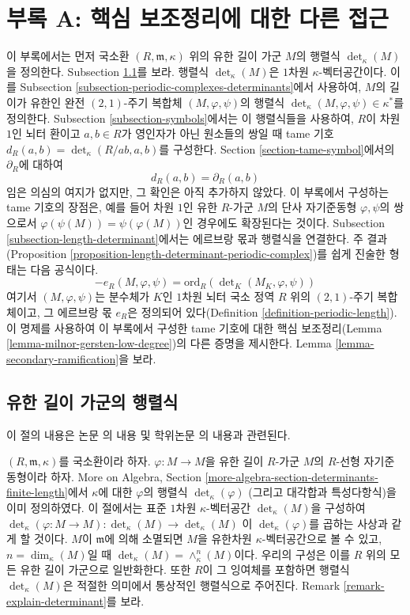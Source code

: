 \section{부록 A: 핵심 보조정리에 대한 다른 접근}
\label{section-appendix-A}

\noindent
이 부록에서는 먼저 국소환 $(R, \mathfrak m, \kappa)$ 위의 유한 길이
가군 $M$의 행렬식 $\det_\kappa(M)$을 정의한다. Subsection
\ref{subsection-determinants-finite-length}를 보라. 행렬식
$\det_\kappa(M)$은 $1$차원 $\kappa$-벡터공간이다. 이를 Subsection
\ref{subsection-periodic-complexes-determinants}에서 사용하여,
$M$의 길이가 유한인 완전 $(2, 1)$-주기 복합체
$(M, \varphi, \psi)$의 행렬식
$\det_\kappa(M, \varphi, \psi) \in \kappa^*$를 정의한다.
Subsection \ref{subsection-symbols}에서는 이 행렬식들을 사용하여,
$R$이 차원 $1$인 뇌터 환이고 $a, b \in R$가 영인자가 아닌
원소들의 쌍일 때 tame 기호
$d_R(a, b) = \det_\kappa(R/ab, a, b)$를 구성한다. Section
\ref{section-tame-symbol}에서의 $\partial_R$에 대하여
$$
d_R(a, b) = \partial_R(a, b)
$$
임은 의심의 여지가 없지만, 그 확인은 아직 추가하지 않았다. 이
부록에서 구성하는 tame 기호의 장점은, 예를 들어 차원 $1$인 유한
$R$-가군 $M$의 단사 자기준동형 $\varphi, \psi$의 쌍으로서
$\varphi(\psi(M)) = \psi(\varphi(M))$인 경우에도 확장된다는
것이다. Subsection \ref{subsection-length-determinant}에서는
에르브랑 몫과 행렬식을 연결한다. 주 결과(Proposition
\ref{proposition-length-determinant-periodic-complex})를 쉽게
진술한 형태는 다음 공식이다.
$$
-e_R(M, \varphi, \psi) =
\text{ord}_R(\det\nolimits_K(M_K, \varphi, \psi))
$$
여기서 $(M, \varphi, \psi)$는 분수체가 $K$인 $1$차원 뇌터 국소
정역 $R$ 위의 $(2, 1)$-주기 복합체이고, 그 에르브랑 몫 $e_R$은
정의되어 있다(Definition \ref{definition-periodic-length}).
이 명제를 사용하여 이 부록에서 구성한 tame 기호에 대한 핵심
보조정리(Lemma \ref{lemma-milnor-gersten-low-degree})의 다른 증명을
제시한다. Lemma \ref{lemma-secondary-ramification}을 보라.

\subsection{유한 길이 가군의 행렬식}
\label{subsection-determinants-finite-length}

\noindent
이 절의 내용은 논문 \cite{determinant}의 내용 및 학위논문
\cite{Joe}의 내용과 관련된다.

\medskip\noindent
$(R, \mathfrak m, \kappa)$를 국소환이라 하자.
$\varphi : M \to M$을 유한 길이 $R$-가군 $M$의 $R$-선형
자기준동형이라 하자. More on Algebra, Section
\ref{more-algebra-section-determinants-finite-length}에서
$\kappa$에 대한 $\varphi$의 행렬식 $\det_\kappa(\varphi)$
(그리고 대각합과 특성다항식)을 이미 정의하였다. 이 절에서는 표준
$1$차원 $\kappa$-벡터공간 $\det_\kappa(M)$을 구성하여
$\det_\kappa(\varphi : M \to M) : \det_\kappa(M) \to \det_\kappa(M)$
이 $\det_\kappa(\varphi)$를 곱하는 사상과 같게 할 것이다.
$M$이 $\mathfrak m$에 의해 소멸되면 $M$을 유한차원
$\kappa$-벡터공간으로 볼 수 있고,
$n = \dim_\kappa(M)$일 때
$\det_\kappa(M) = \wedge^n_\kappa(M)$이다. 우리의 구성은 이를
$R$ 위의 모든 유한 길이 가군으로 일반화한다. 또한 $R$이 그
잉여체를 포함하면 행렬식 $\det_\kappa(M)$은 적절한 의미에서
통상적인 행렬식으로 주어진다. Remark
\ref{remark-explain-determinant}를 보라.

